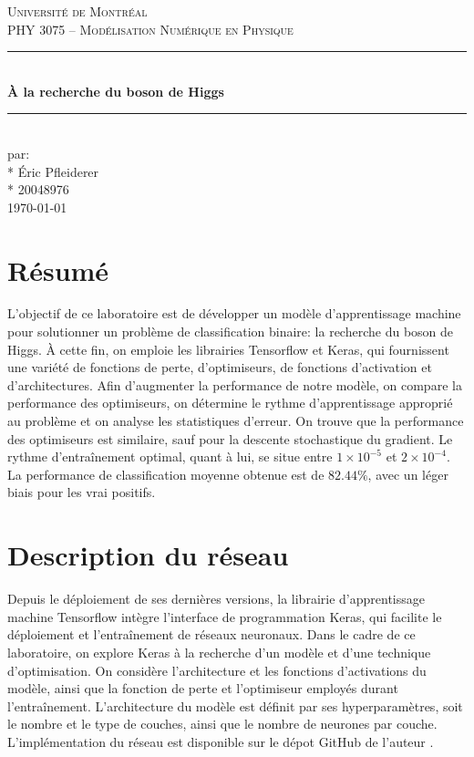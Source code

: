 \documentclass{article}
\begin{document}
	
\begin{titlepage}
	\centering
	\vspace*{1cm}
	\textsc{\LARGE Université de Montréal}\\[1cm] 
	\textsc{\Large PHY 3075 -- Modélisation Numérique en Physique}\\[3cm]
	\vspace{1cm}
	\rule{\linewidth}{0.5mm} \\[0.5cm]
	{\LARGE \bfseries À la recherche du boson de Higgs} \\[0.2cm]
	\rule{\linewidth}{0.5mm} \\[3cm]
	\vspace{1cm}
	\large par: \\*
	Éric Pfleiderer \\* 
	20048976\\[3cm] 
	\vspace{1cm}
	{\large \today}\\[3cm]
	\vfill
\end{titlepage}


\section*{Résumé}

\begin{center}
	L'objectif de ce laboratoire est de développer un modèle d'apprentissage machine pour solutionner un problème de classification binaire: la recherche du boson de Higgs. À cette fin, on emploie les librairies Tensorflow et Keras, qui fournissent une variété de fonctions de perte, d'optimiseurs, de fonctions d'activation et d'architectures. Afin d'augmenter la performance de notre modèle, on compare la performance des optimiseurs, on détermine le rythme d'apprentissage approprié au problème et on analyse les statistiques d'erreur. On trouve que la performance des optimiseurs est similaire, sauf pour la descente stochastique du gradient. Le rythme d'entraînement optimal, quant à lui, se situe entre $1\times10^{-5}$ et $2\times10^{-4}$. La performance de classification moyenne obtenue est de $82.44\%$, avec un léger biais pour les vrai positifs.
\end{center}

\section{Description du réseau}

Depuis le déploiement de ses dernières versions, la librairie d'apprentissage machine Tensorflow\cite{tensorflow} intègre l'interface de programmation Keras\cite{keras}, qui facilite le déploiement et l'entraînement de réseaux neuronaux. Dans le cadre de ce laboratoire, on explore Keras à la recherche d'un modèle et d'une technique d'optimisation. On considère l'architecture et les fonctions d'activations du modèle, ainsi que la fonction de perte et l'optimiseur employés durant l'entraînement. L'architecture du modèle est définit par ses hyperparamètres, soit le nombre et le type de couches, ainsi que le nombre de neurones par couche. L'implémentation du réseau est disponible sur le dépot  GitHub de l'auteur \cite{github}.
\end{document}

